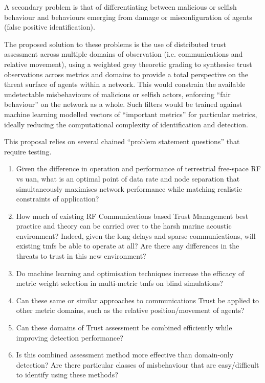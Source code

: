 A secondary problem is that of differentiating between malicious or selfish behaviour and behaviours emerging from damage or misconfiguration of agents (false positive identification).

The proposed solution to these problems is the use of distributed trust assessment across multiple domains of observation (i.e. communications and relative movement), using a weighted grey theoretic grading to synthesise trust observations across metrics and domains to provide a total perspective on the threat surface of agents within a network.
This would constrain the available undetectable misbehaviours of malicious or selfish actors, enforcing ``fair behaviour'' on the network as a whole.
Such filters would be trained against machine learning modelled vectors of ``important metrics'' for particular metrics, ideally reducing the computational complexity of identification and detection. 

This proposal relies on several chained ``problem statement questions'' that require testing.
\begin{enumerate}[label=\textbf{PSQ.\arabic*},ref=\emph{PSQ. \arabic*}]
	\item Given the difference in operation and performance of terrestrial free-space RF vs \gls{uan}, what is an optimal point of data rate and node separation that simultaneously maximises network performance while matching realistic constraints of application? \label{q:rfuan}
	\item How much of existing RF Communications based Trust Management best practice and theory can be carried over to the harsh marine acoustic environment? Indeed, given the long delays and sparse communications, will existing \glspl{tmf} be able to operate at all? Are there any differences in the threats to trust in this new environment? \label{q:uantmf}
	\item Do machine learning and optimisation techniques increase the efficacy of metric weight selection in multi-metric \glspl{tmf} on blind simulations?\label{q:ml}
	\item Can these same or similar approaches to communications Trust be applied to other metric domains, such as the relative position/movement of agents?\label{q:phys}
	\item Can these domains of Trust assessment be combined efficiently while improving detection performance? \label{q:joint}
	\item Is this combined assessment method more effective than domain-only detection? Are there particular classes of misbehaviour that are easy/difficult to identify using these methods? \label{q:perf}
\end{enumerate}

